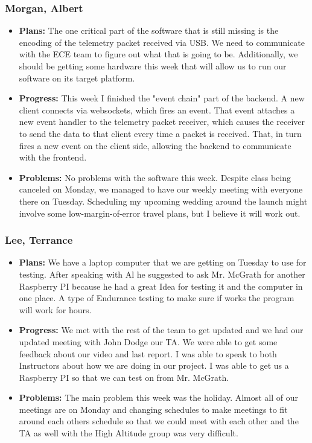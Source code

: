 \documentclass[10pt,draftclsnofoot,onecolumn]{IEEEtran}
\begin{document}
\subsubsection{Morgan, Albert}
\begin{itemize}
	\item \textbf{Plans: }
	The one critical part of the software that is still missing is the encoding of the telemetry packet received via USB. We need to communicate with the ECE team to figure out what that is going to be. Additionally, we should be getting some hardware this week that will allow us to run our software on its target platform.
	\item \textbf{Progress: }
	This week I finished the "event chain" part of the backend. A new client connects via websockets, which fires an event. That event attaches a new event handler to the telemetry packet receiver, which causes the receiver to send the data to that client every time a packet is received. That, in turn fires a new event on the client side, allowing the backend to communicate with the frontend.
	\item \textbf{Problems: }
	No problems with the software this week. Despite class being canceled on Monday, we managed to have our weekly meeting with everyone there on Tuesday. Scheduling my upcoming wedding around the launch might involve some low-margin-of-error travel plans, but I believe it will work out.
\end{itemize}
\subsubsection{Lee, Terrance}
\begin{itemize}
	\item \textbf{Plans: }
	We have a laptop computer that we are getting on Tuesday to use for testing. After speaking with Al he suggested to ask Mr. McGrath for another Raspberry PI because he had a great Idea for testing it and the computer in one place. A type of Endurance testing to make sure if works the program will work for hours.
	\item \textbf{Progress: }
	We met with the rest of the team to get updated and we had our updated meeting with John Dodge our TA. We were able to get some feedback about our video and last report. I was able to speak to both Instructors about how we are doing in our project. I was able to get us a Raspberry PI so that we can test on from Mr. McGrath.
	\item \textbf{Problems: }
	The main problem this week was the holiday. Almost all of our meetings are on Monday and changing schedules to make meetings to fit around each others schedule so that we could meet with each other and the TA as well with the High Altitude group was very difficult.
\end{itemize}
\end{document}
